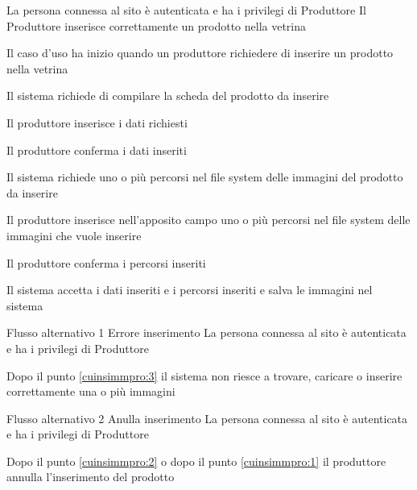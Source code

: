 \tabcuvspace

{}
{La persona connessa al sito è autenticata e ha i privilegi di Produttore}
{Il Produttore inserisce correttamente un prodotto nella vetrina}
{\begin{enumCU}
		\item Il caso d'uso ha inizio quando un produttore richiedere di inserire un prodotto nella vetrina
		\item Il sistema richiede di compilare la scheda del prodotto da inserire
		\item Il produttore inserisce i dati richiesti \label{cuinsimmpro:1}
		\item Il produttore conferma i dati inseriti 
		\item Il sistema richiede uno o più percorsi nel file system delle immagini del prodotto da inserire
		\item Il produttore inserisce nell'apposito campo uno o più percorsi nel file system delle immagini che vuole inserire \label{cuinsimmpro:2}
		\item Il produttore conferma i percorsi inseriti \label{cuinsimmpro:3}
		\item Il sistema accetta i dati inseriti e i percorsi inseriti e salva le immagini nel sistema
	\end{enumCU}}
%
{Flusso alternativo 1}%
{Errore inserimento}%
{La persona connessa al sito è autenticata e ha i privilegi di Produttore}%
{\postNulle}%
{\begin{enumCU}
		\item Dopo il punto \ref{cuinsimmpro:3} il sistema non riesce a trovare, caricare o inserire correttamente una o più immagini
	\end{enumCU}}%
%
{Flusso alternativo 2}%
{Anulla inserimento}%
{La persona connessa al sito è autenticata e ha i privilegi di Produttore}%
{\postNulle}%
{\begin{enumCU}
		\item Dopo il punto \ref{cuinsimmpro:2} o dopo il punto \ref{cuinsimmpro:1} il produttore annulla l'inserimento del prodotto
	\end{enumCU}}%

\tabcuvspace

